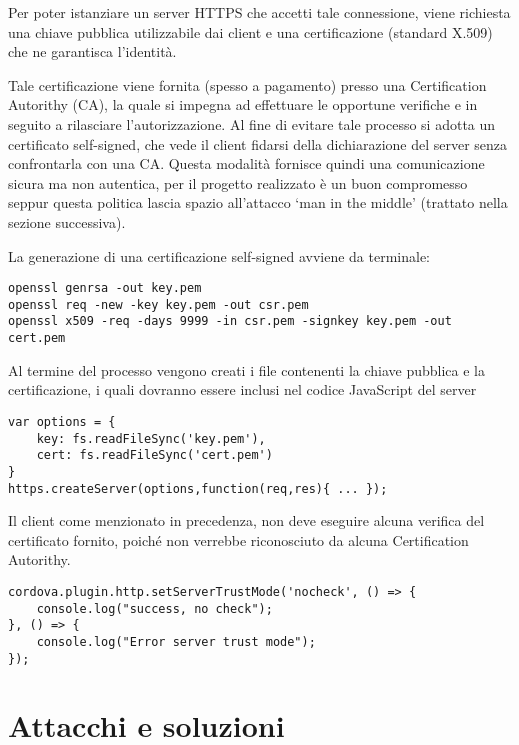 \documentclass[target=bach]{thud}
\begin{document}
    Per poter istanziare un server HTTPS che accetti tale connessione, viene richiesta una chiave pubblica utilizzabile dai client e una certificazione (standard X.509) che ne garantisca l'identità.

    Tale certificazione viene fornita (spesso a pagamento) presso una Certification Autorithy (CA), la quale si impegna ad effettuare le opportune verifiche e in seguito a rilasciare l'autorizzazione. Al fine di evitare tale processo si adotta un certificato self-signed, che vede il client fidarsi della dichiarazione del server senza confrontarla con una CA.
    Questa modalità fornisce quindi una comunicazione sicura ma non autentica, per il progetto realizzato è un buon compromesso seppur questa politica lascia spazio all'attacco `man in the middle' (trattato nella sezione successiva).
    \newpage

    La generazione di una certificazione self-signed avviene da terminale:
\begin{lstlisting}
openssl genrsa -out key.pem
openssl req -new -key key.pem -out csr.pem
openssl x509 -req -days 9999 -in csr.pem -signkey key.pem -out cert.pem
\end{lstlisting}

    Al termine del processo vengono creati i file contenenti la chiave pubblica e la certificazione, i quali dovranno essere inclusi nel codice JavaScript del server
\begin{lstlisting}
var options = {
    key: fs.readFileSync('key.pem'),
    cert: fs.readFileSync('cert.pem')
}
https.createServer(options,function(req,res){ ... });
\end{lstlisting}

    Il client come menzionato in precedenza, non deve eseguire alcuna verifica del certificato fornito, poiché non verrebbe riconosciuto da alcuna Certification Autorithy.
\begin{lstlisting}
cordova.plugin.http.setServerTrustMode('nocheck', () => {
    console.log("success, no check");
}, () => {
    console.log("Error server trust mode");
});
\end{lstlisting}


\section{Attacchi e soluzioni}
\end{document}
